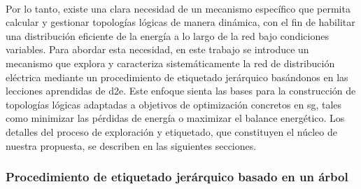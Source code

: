 \\
Por lo tanto, existe una clara necesidad de un mecanismo específico que permita calcular y gestionar topologías lógicas de manera dinámica, con el fin de habilitar una distribución eficiente de la energía a lo largo de la red bajo condiciones variables. Para abordar esta necesidad, en este trabajo se introduce un mecanismo que explora y caracteriza sistemáticamente la red de distribución eléctrica mediante un procedimiento de etiquetado jerárquico basándonos en las lecciones aprendidas de \gls{d2e}. Este enfoque sienta las bases para la construcción de topologías lógicas adaptadas a objetivos de optimización concretos en \gls{sg}, tales como minimizar las pérdidas de energía o maximizar el balance energético. Los detalles del proceso de exploración y etiquetado, que constituyen el núcleo de nuestra propuesta, se describen en las siguientes secciones.


\subsubsection{Procedimiento de etiquetado jerárquico basado en un árbol}
\label{subsec:tree}

